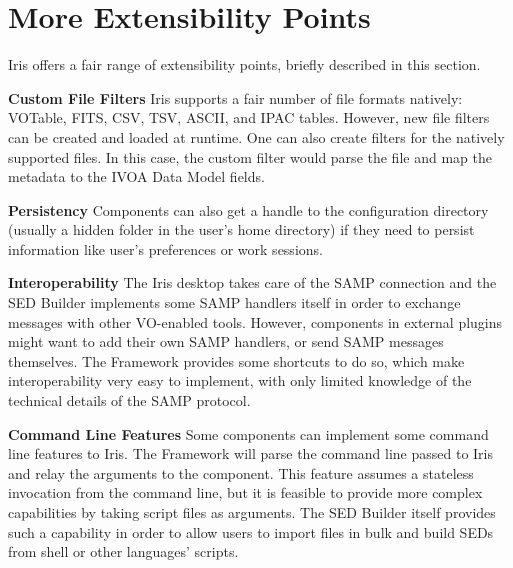 \section{More Extensibility Points}
Iris offers a fair range of extensibility points, briefly described in this section.

\textbf{Custom File Filters}
Iris supports a fair number of file formats natively: VOTable, FITS, CSV, TSV, ASCII, and IPAC tables. However, new file filters can be created and loaded at runtime. One can also create filters for the natively supported files. In this case, the custom filter would parse the file and map the metadata to the IVOA Data Model fields.

\textbf{Persistency}
Components can also get a handle to the configuration directory (usually a hidden folder in the user's home directory) if they need to persist information like user's preferences or work sessions.

\textbf{Interoperability}
The Iris desktop takes care of the SAMP connection and the SED Builder implements some SAMP handlers itself in order to exchange messages with other VO-enabled tools. However, components in external plugins might want to add their own SAMP handlers, or send SAMP messages themselves. The Framework provides some shortcuts to do so, which make interoperability very easy to implement, with only limited knowledge of the technical details of the SAMP protocol.

\textbf{Command Line Features}
Some components can implement some command line features to Iris. The Framework will parse the command line passed to Iris and relay the arguments to the component. This feature assumes a stateless invocation from the command line, but it is feasible to provide more complex capabilities by taking script files as arguments. The SED Builder itself provides such a capability in order to allow users to import files in bulk and build SEDs from shell or other languages' scripts.

